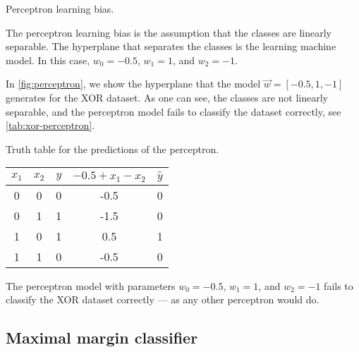 \begin{figurebox}[label=fig:perceptron]{Perceptron learning bias.}
  \centering
  \tcblower
  The perceptron learning bias is the assumption that the classes are linearly separable.
  The hyperplane that separates the classes is the learning machine model.
  In this case, $w_0 = -0.5$, $w_1 = 1$, and $w_2 = -1$.
\end{figurebox}

In \cref{fig:perceptron}, we show the hyperplane that the model $\vec{w} = [-0.5, 1, -1]$
generates for the XOR dataset.  As one can see, the classes are not linearly separable,
and the perceptron model fails to classify the dataset correctly, see \cref{tab:xor-perceptron}.

\begin{tablebox}[label=tab:xor-perceptron]{Truth table for the predictions of the perceptron.}
  \centering
  \begin{tabular}{ccc|cc}
    \toprule
    $x_1$ & $x_2$ & $y$ & $-0.5 + x_1 - x_2$ & $\hat{y}$ \\
    \midrule
    0 & 0 & 0 & -0.5 & 0 \\
    0 & 1 & 1 & -1.5 & 0 \\
    1 & 0 & 1 & 0.5 & 1 \\
    1 & 1 & 0 & -0.5 & 0 \\
    \bottomrule
  \end{tabular}
  \tcblower
  The perceptron model with parameters $w_0 = -0.5$, $w_1 = 1$, and $w_2 = -1$
  fails to classify the XOR dataset correctly --- as any other perceptron would do.
\end{tablebox}

\subsection{Maximal margin classifier}

